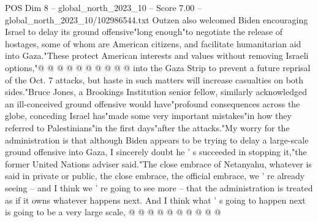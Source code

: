 \begin{textsample}{POS Dim 8 – global\_north\_2023\_10 – Score 7.00 – global\_north\_2023\_10/102986544.txt}
Outzen also welcomed Biden encouraging Israel to delay its ground offensive"long enough"to negotiate the release of hostages, some of whom are American citizens, and facilitate humanitarian aid into Gaza."These protect American interests and values without removing Israeli options,"@ @ @ @ @ @ @ @ @ @ into the Gaza Strip to prevent a future reprisal of the Oct. 7 attacks, but haste in such matters will increase casualties on both sides."Bruce Jones, a Brookings Institution senior fellow, similarly acknowledged an ill-conceived ground offensive would have"profound consequences across the globe, conceding Israel has"made some very important mistakes"in how they referred to Palestinians"in the first days"after the attacks."My worry for the administration is that although Biden appears to be trying to delay a large-scale ground offensive into Gaza, I sincerely doubt he ' s succeeded in stopping it,"the former United Nations adviser said."The close embrace of Netanyahu, whatever is said in private or public, the close embrace, the official embrace, we ' re already seeing -- and I think we ' re going to see more -- that the administration is treated as if it owns whatever happens next.
And I think what ' s going to happen next is going to be a very large scale, @ @ @ @ @ @ @ @ @ @

\end{textsample}
